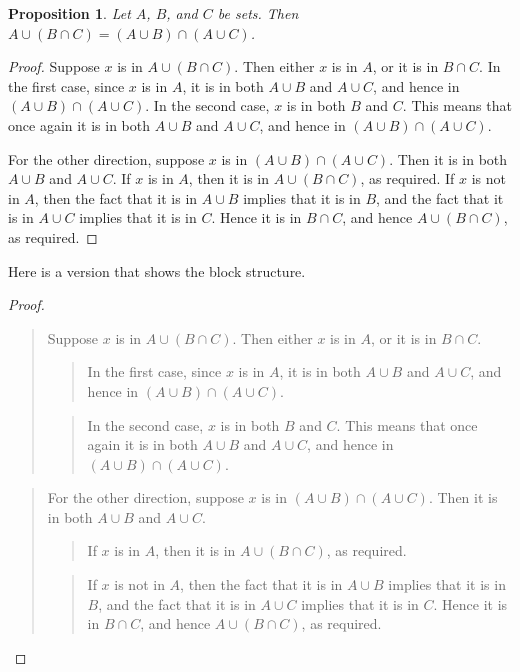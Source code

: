 \documentclass{article}
\newtheorem{proposition}[theorem]{Proposition}
\begin{document}
 
\begin{proposition} 
Let $A$, $B$, and $C$ be sets. Then $A \cup (B \cap C) = (A \cup B) \cap (A 
\cup C)$.
\end{proposition}

\begin{proof}
Suppose $x$ is in $A \cup (B \cap C)$. Then either $x$ is in $A$, or it is in 
$B \cap C$. In the first case, since $x$ is in $A$, it is in both $A \cup B$ and 
$A \cup C$, and hence in $(A \cup B) \cap (A \cup C)$. In the second case, $x$ 
is in both $B$ and $C$. This means that once again it is in both $A \cup B$ and 
$A \cup C$, and hence in $(A \cup B) \cap (A \cup C)$.

For the other direction, suppose $x$ is in $(A \cup B) \cap (A \cup C)$. Then 
it is in both $A \cup B$ and $A \cup C$. If $x$ is in $A$, then it is in $A \cup 
(B \cap C)$, as required. If $x$ is not in $A$, then the fact that it is in $A 
\cup B$ implies that it is in $B$, and the fact that it is in $A \cup C$ implies 
that it is in $C$. Hence it is in $B \cap C$, and hence $A \cup (B \cap C)$, as 
required.
\end{proof}

Here is a version that shows the block structure.

\begin{proof}\ 
\begin{quote}
Suppose $x$ is in $A \cup (B \cap C)$. Then either $x$ is in $A$, or it is in $B 
\cap C$. 
\begin{quote}
In the first case, since $x$ is in $A$, it is in both $A \cup B$ and 
$A \cup C$, and hence in $(A \cup B) \cap (A \cup C)$. 
\end{quote}
\begin{quote}
In the second case, $x$ 
is in both $B$ and $C$. This means that once again it is in both $A \cup B$ and 
$A \cup C$, and hence in $(A \cup B) \cap (A \cup C)$.
\end{quote}
\end{quote}

\begin{quote}
For the other direction, suppose $x$ is in $(A \cup B) \cap (A \cup C)$. Then it 
is in both $A \cup B$ and $A \cup C$. 
\begin{quote}
If $x$ is in $A$, then it is in $A \cup (B \cap C)$, as required. 
\end{quote}
\begin{quote}
If $x$ is not in $A$, then the fact that it is in $A \cup B$ implies that it is 
in $B$, and the fact that it is in $A \cup C$ implies that it is in $C$. Hence 
it is in $B \cap C$, and hence $A \cup (B \cap C)$, as required. 
\end{quote}
\end{quote}
\end{proof}
\end{document}
